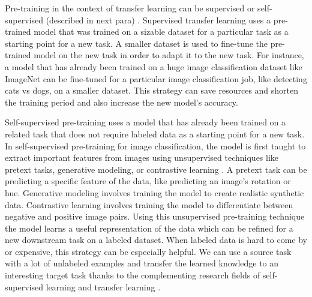 Pre-training in the context of transfer learning can be supervised or self-supervised (described in next para) \cite{Mao2020}. Supervised transfer learning uses a pre-trained model that was trained on a sizable dataset for a particular task as a starting point for a new task. A smaller dataset is used to fine-tune the pre-trained model on the new task in order to adapt it to the new task. For instance, a model that has already been trained on a huge image classification dataset like ImageNet \cite{Russakovsky2015} can be fine-tuned for a particular image classification job, like detecting cats vs dogs, on a smaller dataset. This strategy can save resources and shorten the training period and also increase the new model's accuracy.

Self-supervised pre-training uses a model that has already been trained on a related task that does not require labeled data as a starting point for a new task.  In self-supervised pre-training for image classification, the model is first taught to extract important features from images using unsupervised techniques like pretext tasks, generative modeling, or contrastive learning \cite{9462394}. A pretext task can be predicting a specific feature of the data, like predicting an image's rotation or hue. Generative modeling involves training the model to create realistic synthetic data.  Contrastive learning involves training the model to differentiate between negative and positive image pairs. Using this unsupervised pre-training technique the model learns a useful representation of the data which can be refined for a new downstream task on a  labeled dataset. When labeled data is hard to come by or expensive, this strategy can be especially helpful. We can use a source task with a lot of unlabeled examples and transfer the learned knowledge to an interesting target task thanks to the complementing research fields of self-supervised learning and transfer learning \cite{Mao2020}.

